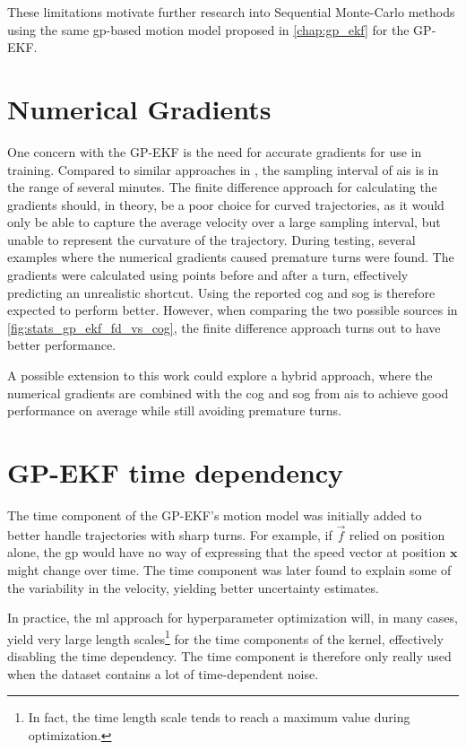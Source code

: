 These limitations motivate further research into Sequential Monte-Carlo methods using the same \acrshort{gp}-based motion model proposed in \cref{chap:gp_ekf} for the GP-EKF.  

\section{Numerical Gradients}
One concern with the GP-EKF is the need for accurate gradients for use in training. Compared to similar approaches in \cite{vehicle_gp_prediction,pedestrian}, the sampling interval of \acrshort{ais} is in the range of several minutes. The finite difference approach for calculating the gradients should, in theory, be a poor choice for curved trajectories, as it would only be able to capture the average velocity over a large sampling interval, but unable to represent the curvature of the trajectory. During testing, several examples where the numerical gradients caused premature turns were found. The gradients were calculated using points before and after a turn, effectively predicting an unrealistic shortcut.  Using the reported \acrshort{cog} and \acrshort{sog} is therefore expected to perform better. However, when comparing the two possible sources in \cref{fig:stats_gp_ekf_fd_vs_cog}, the finite difference approach turns out to have better performance. 

A possible extension to this work could explore a hybrid approach, where the numerical gradients are combined with the \acrshort{cog} and \acrshort{sog} from \acrshort{ais} to achieve good performance on average while still avoiding premature turns. 

\section{GP-EKF time dependency}
The time component of the GP-EKF's motion model was initially added to better handle trajectories with sharp turns. For example, if $\vec{f}$ relied on position alone, the \acrshort{gp} would have no way of expressing that the speed vector at position $\boldsymbol{x}$ might change over time. The time component was later found to explain some of the variability in the velocity, yielding better uncertainty estimates.

In practice, the \acrshort{ml} approach for hyperparameter optimization will, in many cases, yield very large length scales\footnote{In fact, the time length scale tends to reach a maximum value during optimization.} for the time components of the kernel, effectively disabling the time dependency. The time component is therefore only really used when the dataset contains a lot of time-dependent noise.

